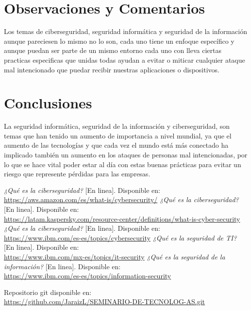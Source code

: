 \documentclass[12pt]{article}
\begin{document}
\section*{Observaciones y Comentarios}
Los temas de ciberseguridad, seguridad informática y seguridad de la información aunque pareciesen lo mismo no lo son, cada uno tiene un enfoque específico y aunque puedan ser parte de un mismo entorno cada uno con lleva ciertas practicas especificas que unidas todas ayudan a evitar o miticar cualquier ataque mal intencionado que puedar recibir nuestras aplicaciones o dispositivos.


\section*{Conclusiones}
La seguridad informática, seguridad de la información y ciberseguridad, son temas que han tenido un aumento de importancia a nivel mundial, ya que el aumento de las tecnologías y que cada vez el mundo está más conectado ha implicado también un aumento en los ataques de  personas mal intencionadas, por lo que se hace vital poder estar al día con estas buenas prácticas para evitar un riesgo que represente pérdidas para las empresas.

\begin{thebibliography}{9}
\textit{¿Qué es la ciberseguridad?} [En linea]. Disponible en:\\ \url{https://aws.amazon.com/es/what-is/cybersecurity/}
\textit{¿Qué es la ciberseguridad? }[En linea]. Disponible en:\\ \url{https://latam.kaspersky.com/resource-center/definitions/what-is-cyber-security}
\textit{¿Qué es la ciberseguridad?} [En linea]. Disponible en:\\ \url{https://www.ibm.com/es-es/topics/cybersecurity}
\textit{¿Qué es la seguridad de TI?} [En linea]. Disponible en:\\ \url{https://www.ibm.com/mx-es/topics/it-security}
\textit{¿Qué es la seguridad de la información?} [En linea]. Disponible en:\\ \url{https://www.ibm.com/es-es/topics/information-security}

\end{thebibliography}

Repositorio git disponible en:\\ \url{https://github.com/JaraizL/SEMINARIO-DE-TECNOLOG-AS.git}
\end{document}
